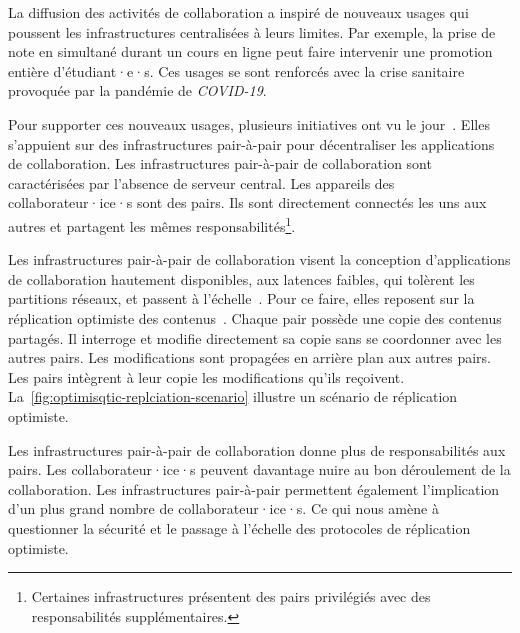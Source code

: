 La diffusion des activités de collaboration a inspiré de nouveaux usages qui poussent les infrastructures centralisées à leurs limites.
Par exemple, la prise de note en simultané durant un cours en ligne peut faire intervenir une promotion entière d'étudiant·e·s.
Ces usages se sont renforcés avec la crise sanitaire provoquée par la pandémie de \emph{COVID-19}.

Pour supporter ces nouveaux usages, plusieurs initiatives ont vu le jour~\autocite{benet2014ipfs,wood2014ethereum,mansour2016demonstration}.
Elles s'appuient sur des infrastructures pair-à-pair pour décentraliser les applications de collaboration.
Les infrastructures pair-à-pair de collaboration sont caractérisées par l'absence de serveur central.
Les appareils des collaborateur·ice·s sont des pairs.
Ils sont directement connectés les uns aux autres et partagent les mêmes responsabilités\footnote{Certaines infrastructures présentent des pairs privilégiés avec des responsabilités supplémentaires.%
}.

Les infrastructures pair-à-pair de collaboration visent la conception d'applications de collaboration hautement disponibles, aux latences faibles, qui tolèrent les partitions réseaux, et passent à l'échelle~\autocite{rodrigues2010peer}.
Pour ce faire, elles reposent sur la réplication optimiste des contenus~\autocite{saito_2005_optimisticreplication}.
Chaque pair possède une copie des contenus partagés.
Il interroge et modifie directement sa copie sans se coordonner avec les autres pairs.
Les modifications sont propagées en arrière plan aux autres pairs.
Les pairs intègrent à leur copie les modifications qu'ils reçoivent.
La~\autoref{fig:optimisqtic-replciation-scenario} illustre un scénario de réplication optimiste.


Les infrastructures pair-à-pair de collaboration donne plus de responsabilités aux pairs.
Les collaborateur·ice·s peuvent davantage nuire au bon déroulement de la collaboration.
Les infrastructures pair-à-pair permettent également l'implication d'un plus grand nombre de collaborateur·ice·s.
Ce qui nous amène à questionner la sécurité et le passage à l'échelle des protocoles de réplication optimiste.


